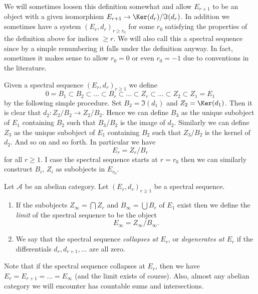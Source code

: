 \noindent
We will sometimes loosen this definition somewhat and allow $E_{r + 1}$
to be an object with a given isomorphism
$E_{r + 1} \to \Ker(d_r)/\Im(d_r)$.
In addition we sometimes have a system $(E_r, d_r)_{r \geq r_0}$
for some $r_0$ satisfying the properties of the definition above
for indices $\geq r$. We will also call this a spectral sequence since by
a simple renumbering it falls under the definition anyway.
In fact, sometimes it makes sense to allow $r_0 = 0$ or even $r_0 = -1$
due to conventions in the literature.

\medskip\noindent
Given a spectral sequence $(E_r, d_r)_{r \geq 1}$ we define
$$
0 = B_1 \subset B_2 \subset \ldots \subset B_r \subset \ldots
\subset Z_r \subset \ldots \subset Z_2 \subset Z_1 = E_1
$$
by the following simple procedure. Set $B_2 = \Im(d_1)$
and $Z_2 = \Ker(d_1)$. Then it is clear that
$d_2 : Z_2/B_2 \to Z_2/B_2$. Hence we can define $B_3$ as the unique
subobject of $E_1$ containing $B_2$ such that $B_3/B_2$ is the image
of $d_2$. Similarly we can define $Z_3$ as the unique subobject of
$E_1$ containing $B_2$ such that $Z_3/B_2$ is the kernel of $d_2$.
And so on and so forth. In particular we have
$$
E_r = Z_r/B_r
$$
for all $r \geq 1$. I case the spectral sequence starts at $r = r_0$
then we can similarly construct $B_i$, $Z_i$ as subobjects in $E_{r_0}$.

\begin{definition}
\label{definition-limit-spectral-sequence}
Let $\mathcal{A}$ be an abelian category.
Let $(E_r, d_r)_{r \geq 1}$ be a spectral sequence.
\begin{enumerate}
\item If the subobjects $Z_{\infty} = \bigcap Z_r$
and $B_{\infty} = \bigcup B_r$ of $E_1$ exist then we define
the {\it limit} of the spectral sequence to be the object
$$
E_{\infty} = Z_{\infty}/B_{\infty}.
$$
\item We say that the spectral sequence {\it collapses at $E_r$}, or
{\it degenerates at $E_r$} if the differentials $d_r, d_{r + 1}, \ldots$ are
all zero.
\end{enumerate}
\end{definition}

\noindent
Note that if the spectral sequence collapses at $E_r$, then
we have $E_r = E_{r + 1} = \ldots = E_{\infty}$ (and the limit
exists of course). Also, almost any abelian category we will encounter
has countable sums and intersections.











